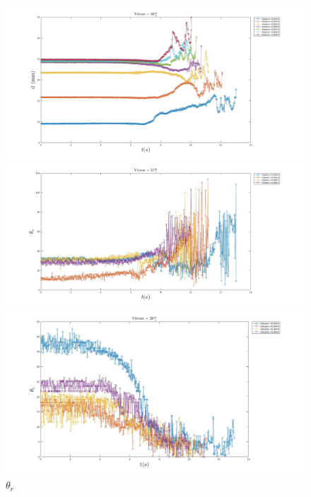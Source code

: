 \documentclass[french]{article}
\begin{document}
\begin{figure}[!h]
	\begin{minipage}{0.95\linewidth}
	\includegraphics[width = \linewidth]{./image/v=20d.jpg}
	\caption{$d$}
	\end{minipage}
	\begin{minipage}{0.95\linewidth}
	\includegraphics[width = \linewidth]{./image/v=20oa_2.jpg}
	\caption{$\theta_{a}$}
	\end{minipage}
	\begin{minipage}{0.95\linewidth}
	\includegraphics[width = \linewidth]{./image/v=20or_2.jpg}
	\caption{$\theta_{r}$}
	\end{minipage}
\end{figure}
\end{document}
